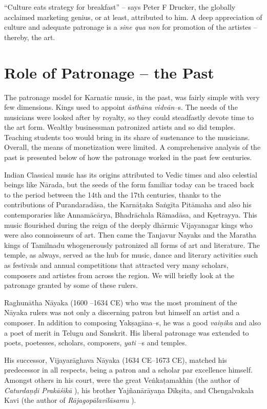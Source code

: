 “Culture eats strategy for breakfast” – says Peter F Drucker, the globally acclaimed marketing genius, or at least, attributed to him. A deep appreciation of culture and adequate patronage is a \textit{sine qua non} for promotion of the artistes – thereby, the art.


\section*{Role of Patronage – the Past}

The patronage model for Karnatic music, in the past, was fairly simple with very few dimensions. Kings used to appoint \textit{āsthāna vidvān–}s. The needs of the musicians were looked after by royalty, so they could steadfastly devote time to the art form. Wealthy businessman patronized artists and so did temples. Teaching students too would bring in its share of sustenance to the musicians. Overall, the means of monetization were limited. A comprehensive analysis of the past is presented below of how the patronage worked in the past few centuries.

Indian Classical music has its origins attributed to Vedic times and also celestial beings like Nārada, but the seeds of the form familiar today can be traced back to the period between the 14th and the 17th centuries, thanks to the contributions of Purandaradāsa, the Karnāṭaka Saṅgīta Pitāmaha and also his contemporaries like Annamācārya, Bhadrāchala Rāmadāsa, and Kṣetrayya. This music flourished during the reign of the deeply dhārmic Vijayanagar kings who were also connoisseurs of art. Then came the Tanjavur Nayaks and the Maratha kings of Tamilnadu whogenerously patronized all forms of art and literature. The temple, as always, served as the hub for music, dance and literary activities such as festivals and annual competitions that attracted very many scholars, composers and artistes from across the region. We will briefly look at the patronage granted by some of these rulers.

Raghunātha Nāyaka (1600 –1634 CE) who was the most prominent of the Nāyaka rulers was not only a discerning patron but himself an artist and a composer. In addition to composing Yakṣagāna–s, he was a good \textit{vaiṇika} and also a poet of merit in Telugu and Sanskrit. His liberal patronage was extended to poets, poetesses, scholars, composers, \textit{yati} –s and temples.

His successor, Vijayarāghava Nāyaka (1634 CE–1673 CE), matched his predecessor in all respects, being a patron and a scholar par excellence himself. Amongst others in his court, were the great Veṅkaṭamakhin (the author of \textit{Caturdaṇḍi Prakāśikā} ), his brother Yajñanārāyaṇa Dīkṣita, and Chengalvakala Kavi (the author of \textit{Rājagopālavilāsamu} ).

